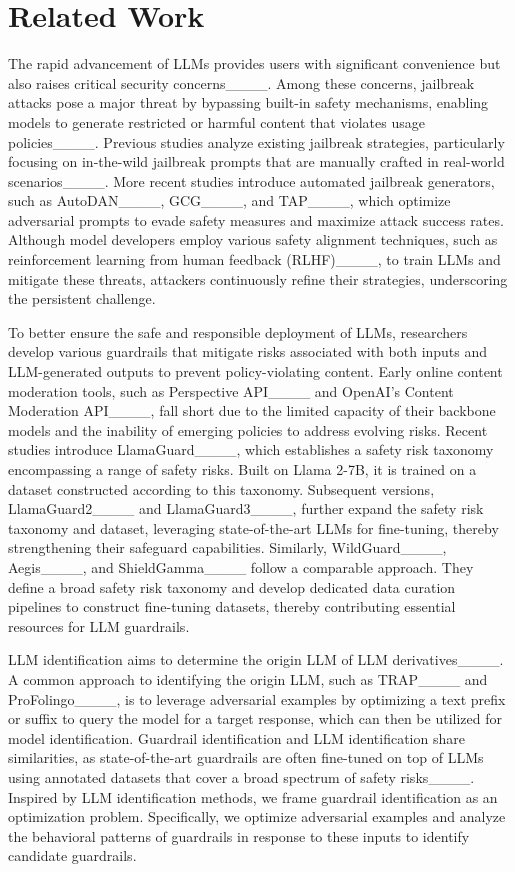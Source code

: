 \section{Related Work}

The rapid advancement of LLMs provides users with significant convenience but also raises critical security concerns____.
Among these concerns, jailbreak attacks pose a major threat by bypassing built-in safety mechanisms, enabling models to generate restricted or harmful content that violates usage policies____.
Previous studies analyze existing jailbreak strategies, particularly focusing on in-the-wild jailbreak prompts that are manually crafted in real-world scenarios____.
More recent studies introduce automated jailbreak generators, such as AutoDAN____, GCG____, and TAP____, which optimize adversarial prompts to evade safety measures and maximize attack success rates.
Although model developers employ various safety alignment techniques, such as reinforcement learning from human feedback (RLHF)____, to train LLMs and mitigate these threats, attackers continuously refine their strategies, underscoring the persistent challenge.

To better ensure the safe and responsible deployment of LLMs, researchers develop various guardrails that mitigate risks associated with both inputs and LLM-generated outputs to prevent policy-violating content.
Early online content moderation tools, such as Perspective API____ and OpenAI's Content Moderation API____, fall short due to the limited capacity of their backbone models and the inability of emerging policies to address evolving risks.
Recent studies introduce LlamaGuard____, which establishes a safety risk taxonomy encompassing a range of safety risks.
Built on Llama 2-7B, it is trained on a dataset constructed according to this taxonomy.
Subsequent versions, LlamaGuard2____ and LlamaGuard3____, further expand the safety risk taxonomy and dataset, leveraging state-of-the-art LLMs for fine-tuning, thereby strengthening their safeguard capabilities.
Similarly, WildGuard____, Aegis____, and ShieldGamma____ follow a comparable approach.
They define a broad safety risk taxonomy and develop dedicated data curation pipelines to construct fine-tuning datasets, thereby contributing essential resources for LLM guardrails.

LLM identification aims to determine the origin LLM of LLM derivatives____.
A common approach to identifying the origin LLM, such as TRAP____ and ProFolingo____, is to leverage adversarial examples by optimizing a text prefix or suffix to query the model for a target response, which can then be utilized for model identification.
Guardrail identification and LLM identification share similarities, as state-of-the-art guardrails are often fine-tuned on top of LLMs using annotated datasets that cover a broad spectrum of safety risks____.
Inspired by LLM identification methods, we frame guardrail identification as an optimization problem.
Specifically, we optimize adversarial examples and analyze the behavioral patterns of guardrails in response to these inputs to identify candidate guardrails.

